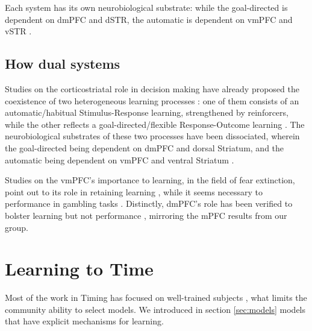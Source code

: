         Each system has its own neurobiological substrate: while the goal-directed is dependent on dmPFC and dSTR, the automatic is dependent on vmPFC and vSTR \cite{dickinson2015instrumental}. 
    
    \subsection{How dual systems }
        
Studies on the corticostriatal role in decision making have already proposed the coexistence of two heterogeneous learning processes \cite{balleine1998goal, balleine2007role, smith2013dual}: one of them consists of an automatic/habitual Stimulus-Response learning, strengthened by reinforcers, while the other reflects a goal-directed/flexible Response-Outcome learning \cite{dickinson2015instrumental}. The neurobiological substrates of these two processes have been dissociated, wherein the goal-directed being dependent on dmPFC and dorsal Striatum, and the automatic being dependent on vmPFC and ventral Striatum \cite{dickinson2015instrumental}.

Studies on the vmPFC's importance to learning, in the field of fear extinction, point out to its role in retaining learning \cite{phelps2004extinction}, while it seems necessary to performance in gambling tasks \cite{rogalsky2012risky}. Distinctly, dmPFC's role has been verified to bolster learning but not performance \cite{balleine2007still}, mirroring the mPFC results from our group.

\section{Learning to Time}
    Most of the work in Timing has focused on well-trained subjects \cite{}, what limits the community ability to select models. We introduced in section \ref{sec:models} models that have explicit mechanisms for learning.

    \subsection{}